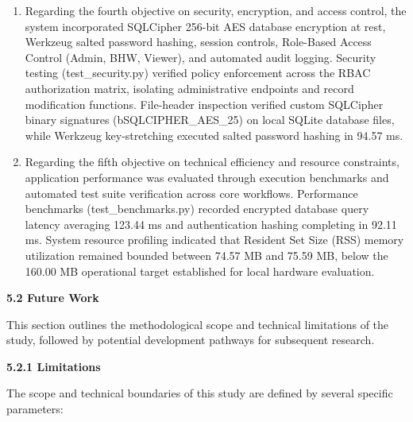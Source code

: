 \documentclass[
]{article}
\begin{document}
\begin{enumerate}
  signed-rank tests with Holm--Šidák correction (\(\alpha = 0.05\))
  demonstrated that Naïve Persistence and OLS Linear Regression produced
  lower error distributions (\(p_{adj} < 0.001\)) than the non-linear or
  static seasonal models evaluated within this dataset. These results
  reflect the temporal autocorrelation observed in short-term weekly
  disease incidence within sparse registries. Using these forecasting
  outputs and historical centile thresholds, the system automated the
  population and sorting of an Intervention Priority Watchlist to order
  high-risk and escalating barangays.
\item
  Regarding the fourth objective on security, encryption, and access
  control, the system incorporated SQLCipher 256-bit AES database
  encryption at rest, Werkzeug salted password hashing, session
  controls, Role-Based Access Control (Admin, BHW, Viewer), and
  automated audit logging. Security testing (test\_security.py) verified
  policy enforcement across the RBAC authorization matrix, isolating
  administrative endpoints and record modification functions.
  File-header inspection verified custom SQLCipher binary signatures
  (b\textquotesingle SQLCIPHER\_AES\_25\textquotesingle) on local SQLite
  database files, while Werkzeug key-stretching executed salted password
  hashing in 94.57 ms.
\item
  Regarding the fifth objective on technical efficiency and resource
  constraints, application performance was evaluated through execution
  benchmarks and automated test suite verification across core
  workflows. Performance benchmarks (test\_benchmarks.py) recorded
  encrypted database query latency averaging 123.44 ms and
  authentication hashing completing in 92.11 ms. System resource
  profiling indicated that Resident Set Size (RSS) memory utilization
  remained bounded between 74.57 MB and 75.59 MB, below the 160.00 MB
  operational target established for local hardware evaluation.
\end{enumerate}

\textbf{5.2 Future Work}

This section outlines the methodological scope and technical limitations
of the study, followed by potential development pathways for subsequent
research.

\textbf{5.2.1 Limitations}

The scope and technical boundaries of this study are defined by several
specific parameters:
\end{document}

